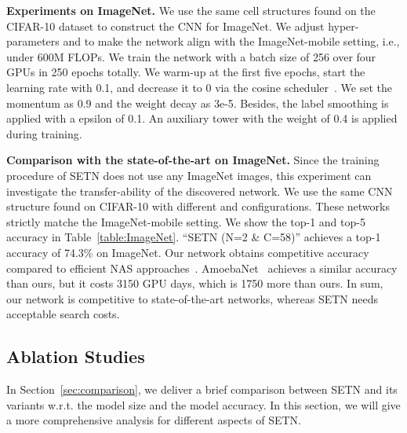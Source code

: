 \documentclass[10pt,twocolumn,letterpaper]{article}
\def\Tabref#1{Table~\ref{#1}}
\def\Secref#1{Section~\ref{#1}}
\def\NAME{{SETN}}
\begin{document}
{\bf Experiments on ImageNet.}
We use the same cell structures found on the CIFAR-10 dataset to construct the CNN for ImageNet.
We adjust hyper-parameters  and  to make the network align with the ImageNet-mobile setting, i.e., under 600M FLOPs.
We train the network with a batch size of 256 over four GPUs in 250 epochs totally.
We warm-up at the first five epochs, start the learning rate with 0.1, and decrease it to 0 via the cosine scheduler~\cite{warmup2017}.
We set the momentum as 0.9 and the weight decay as 3e-5. Besides, the label smoothing is applied with a epsilon of 0.1.
An auxiliary tower with the weight of 0.4 is applied during training.


{\bf Comparison with the state-of-the-art on ImageNet.}
Since the training procedure of {\NAME} does not use any ImageNet images, this experiment can investigate the transfer-ability of the discovered network.
We use the same CNN structure found on CIFAR-10 with different  and  configurations.
These networks strictly matche the ImageNet-mobile setting.
We show the top-1 and top-5 accuracy in \Tabref{table:ImageNet}.
``{\NAME} (N=2 \& C=58)'' achieves a top-1 accuracy of 74.3\% on ImageNet.
Our network obtains competitive accuracy compared to efficient NAS approaches~\cite{liu2019darts,xie2019snas,zhang2019graph}.
AmoebaNet~\cite{real2019regularized} achieves a similar accuracy than ours, but it costs 3150 GPU days, which is 1750 more than ours.
In sum, our network is competitive to state-of-the-art networks, whereas {\NAME} needs acceptable search costs.





\subsection{Ablation Studies}\label{sec:ablation}

In \Secref{sec:comparison}, we deliver a brief comparison between {\NAME} and its variants w.r.t. the model size and the model accuracy.
In this section, we will give a more comprehensive analysis for different aspects of {\NAME}.
\end{document}
